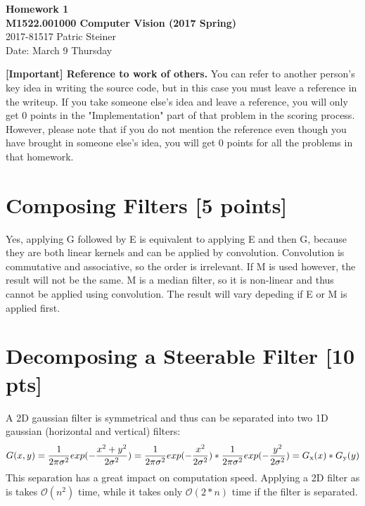 \documentclass[12pt,a4paper]{article}
\begin{document}
\begin{center}
    {\bf\large Homework 1} \\
    {\bf\large M1522.001000 Computer Vision (2017 Spring)} \\
    2017-81517 Patric Steiner \\
    Date: March 9 Thursday
\end{center}

\textbf{[Important] Reference to work of others.} You can refer to another person's key idea in writing the source code, but in this case you must leave a reference in the writeup. If you take someone else's idea and leave a reference, you will only get 0 points in the "Implementation" part of that problem in the scoring process. 
However, please note that if you do not mention the reference even though you have brought in someone else's idea, you will get 0 points for all the problems in that homework.


\section{Composing Filters [5 points]}

Yes, applying G followed by E is equivalent to applying E and then G, because they are both linear kernels and can be applied by convolution. Convolution is commutative and associative, so the order is irrelevant.
If M is used however, the result will not be the same. M is a median filter, so it is non-linear and thus cannot be applied using convolution. The result will vary depeding if E or M is applied first.

\section{Decomposing a Steerable Filter [10 pts]}

A 2D gaussian filter is symmetrical and thus can be separated into two 1D gaussian (horizontal and vertical) filters:
\begin{equation}
    G(x,y) = \frac{1}{2\pi\sigma^2} exp(-\frac{x^2+y^2}{2\sigma^2}) \\
    = \frac{1}{2\pi\sigma^2} exp(-\frac{x^2}{2\sigma^2}) * \frac{1}{2\pi\sigma^2} exp(-\frac{y^2}{2\sigma^2}) \\
    = G\textsubscript{x}(x) * G\textsubscript{y}(y)
\end{equation}
This separation has a great impact on computation speed. Applying a 2D filter as is takes $\mathcal{O}(n^2)$ time, while it takes only $\mathcal{O}(2*n)$ time if the filter is separated.
\end{document}

